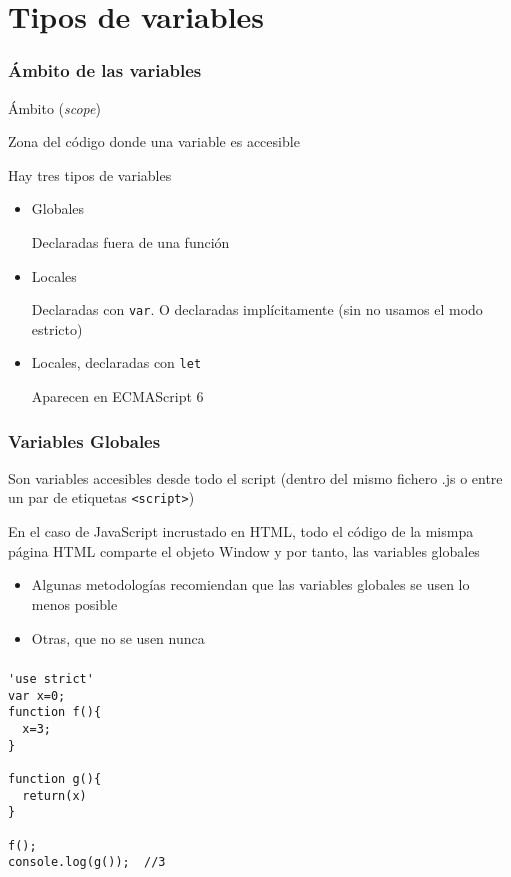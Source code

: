 \documentclass[ucs]{beamer}
\begin{document}
\section{Tipos de variables}
\begin{frame}[fragile]
\frametitle{Ámbito de las variables}
Ámbito (\emph{scope}) 

 Zona del código donde una variable es accesible

Hay tres tipos de variables

\begin{itemize}
\item
Globales

Declaradas fuera de una función

\item
Locales

Declaradas con 
\verb|var|. O declaradas implícitamente (sin no usamos el modo estricto)

\item
Locales, declaradas con 
\verb|let|

Aparecen en ECMAScript 6

\end{itemize}

\end{frame}



\begin{frame}[fragile]
\frametitle{Variables Globales}

Son variables accesibles desde todo el script (dentro del mismo fichero .js
o entre un par de etiquetas \verb|<script>|)

En el caso de JavaScript incrustado en HTML, todo el código de la
mismpa página HTML comparte el objeto Window y por tanto,
las variables globales


\begin{itemize}
\item
Algunas metodologías recomiendan que las variables globales se usen lo menos posible
\item
Otras, que no se usen nunca
\end{itemize}

\end{frame}

\begin{frame}[fragile]
\frametitle{}

  \begin{scriptsize}
  \begin{verbatim}
'use strict'
var x=0;
function f(){
  x=3;
}

function g(){
  return(x)
}

f();
console.log(g());  //3
  \end{verbatim}
  \end{scriptsize}

\end{frame}
\end{document}
